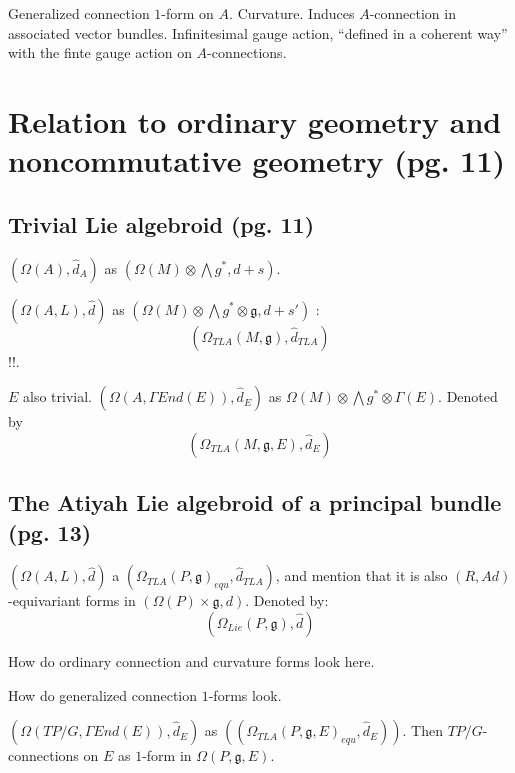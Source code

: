 \documentclass{article}
\begin{document}
Generalized connection $1$-form on $A$. Curvature. Induces $A$-connection in associated vector bundles. Infinitesimal gauge action, ``defined in a coherent way'' with the finte gauge action on $A$-connections.

\section{Relation to ordinary geometry and noncommutative geometry (pg. 11)}

\subsection{Trivial Lie algebroid (pg. 11)}

$(\Omega(A), \hat d_A)$ as $(\Omega(M)\otimes \bigwedge g^*, d + s)$.

$(\Omega(A, L), \hat d)$ as $(\Omega(M)\otimes \bigwedge g^* \otimes \mathfrak g, d + s')$ : \[(\Omega_{TLA}(M, \mathfrak g), \hat d_{TLA})\]!!.

$E$ also trivial. $(\Omega(A, \Gamma End(E)), \hat d_E)$ as $\Omega(M)\otimes \bigwedge g^* \otimes \Gamma(E)$. Denoted by \[ (\Omega_{TLA}(M, \mathfrak g, E), \hat d_{E}) \]

\subsection{The Atiyah Lie algebroid of a principal bundle (pg. 13)}

$(\Omega(A, L), \hat d)$ a $(\Omega_{TLA}(P, \mathfrak g)_{equ}, \hat d_{TLA})$, and mention that it is also $(R, Ad)$-equivariant forms in $(\Omega(P) \times \mathfrak g, d)$. Denoted by: \[ (\Omega_{Lie}(P, \mathfrak g), \hat d) \]

How do ordinary connection and curvature forms look here.

How do generalized connection $1$-forms look.

$(\Omega(TP/G, \Gamma End(E)), \hat d_E)$ as $((\Omega_{TLA}(P, \mathfrak g, E)_{equ}, \hat d_{E}))$. Then $TP/G$-connections on $E$ as $1$-form in $\Omega(P, \mathfrak g, E)$.

\end{document}
